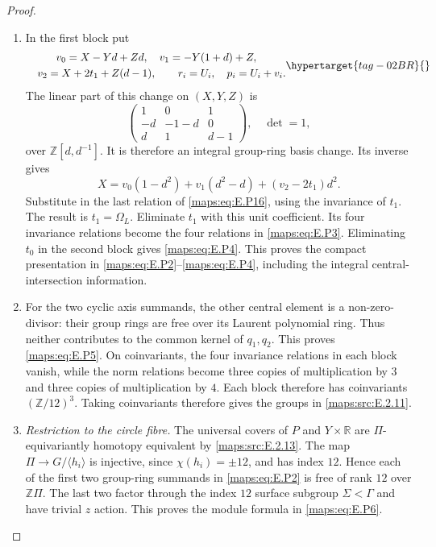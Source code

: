 \documentclass[11pt,a4paper]{article}
\numberwithin{equation}{section}
\theoremstyle{definition}
\begin{document}
\begin{proof}
\begin{enumerate}[label=\arabic*.,leftmargin=*]
\item In the first block put
\label{layout:V:1}
\begin{equation}
\begin{gathered}
v_0=X-Yd+Zd,\quad v_1=-Y(1+d)+Z,
 \\
\quad v_2=X+2t_1+Z(d-1),\qquad
 r_i=U_i,\quad p_i=U_i+v_i.
\end{gathered}
\hypertarget{tag-02BR}{}\label{maps:eq:E.P17}
\end{equation}
The linear part of this change on $(X,Y,Z)$ is
\[
 \begin{pmatrix}1&0&1\\-d&-1-d&0\\d&1&d-1\end{pmatrix},
 \quad\det=1,
\]
over $\mathbb Z[d,d^{-1}]$. It is therefore an
integral group-ring basis change. Its inverse gives
\[
 X=v_0(1-d^2)+v_1(d^2-d)+(v_2-2t_1)d^2.
\]
Substitute in the last relation of \eqref{maps:eq:E.P16}, using
the invariance of $t_1$. The result is
$t_1=\Omega_L$. Eliminate $t_1$ with this unit
coefficient. Its four invariance relations become
the four relations in \eqref{maps:eq:E.P3}. Eliminating $t_0$
in the second block gives \eqref{maps:eq:E.P4}. This proves the
compact presentation in \eqref{maps:eq:E.P2}--\eqref{maps:eq:E.P4}, including
the integral central-intersection information.

\item For the two cyclic axis summands, the other
central element is a non-zero-divisor: their
group rings are free over its Laurent polynomial
ring. Thus neither contributes to the common
kernel of $q_1,q_2$. This proves \eqref{maps:eq:E.P5}. On
coinvariants, the four invariance relations in
each block vanish, while the norm relations
become three copies of multiplication by $3$ and
three copies of multiplication by $4$. Each block
therefore has coinvariants $(\mathbb Z/12)^3$.
Taking coinvariants therefore gives the groups in \cref{maps:src:E.2.11}.

\item \emph{Restriction to the circle fibre.}
The universal covers of $P$ and $Y\times\mathbb R$
are $\Pi$-equivariantly homotopy equivalent by
\ref{maps:src:E.2.13}. The map $\Pi\to G/\langle h_i\rangle$
is injective, since $\chi(h_i)=\pm12$, and has
index $12$. Hence each of the first two group-ring
summands in \eqref{maps:eq:E.P2} is free of rank $12$ over
$\mathbb Z\Pi$. The last two factor through the
index $12$ surface subgroup $\Sigma<\Gamma$ and
have trivial $z$ action. This proves the module
formula in \eqref{maps:eq:E.P6}.


\end{enumerate}
\end{proof}
\end{document}
